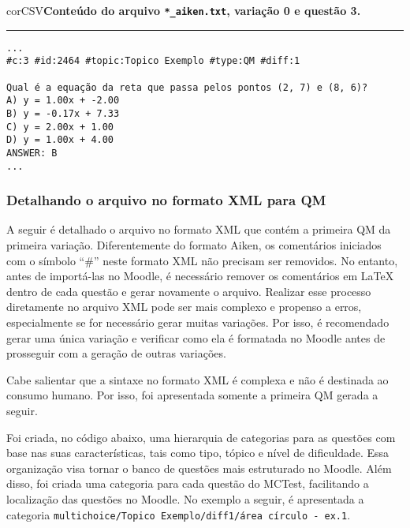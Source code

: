\begin{myboxCode}{corCSV}{\textbf{Conteúdo do arquivo \texttt{*\_aiken.txt}, variação 0 e questão 3.}}\vspace{3mm}
\hrule
\begin{verbatim}
...
#c:3 #id:2464 #topic:Topico Exemplo #type:QM #diff:1

Qual é a equação da reta que passa pelos pontos (2, 7) e (8, 6)?
A) y = 1.00x + -2.00
B) y = -0.17x + 7.33
C) y = 2.00x + 1.00
D) y = 1.00x + 4.00
ANSWER: B
...
\end{verbatim}
\end{myboxCode}

\subsubsection{Detalhando o arquivo no formato XML para QM}

A seguir é detalhado o arquivo no formato XML que contém a primeira QM da primeira variação. Diferentemente do formato Aiken, os comentários iniciados com o símbolo ``\#'' neste formato XML não precisam ser removidos. No entanto, antes de importá-las no Moodle, é necessário remover os comentários em \LaTeX{} dentro de cada questão e gerar novamente o arquivo. Realizar esse processo diretamente no arquivo XML pode ser mais complexo e propenso a erros, especialmente se for necessário gerar muitas variações. Por isso, é recomendado gerar uma única variação e verificar como ela é formatada no Moodle antes de prosseguir com a geração de outras variações.

Cabe salientar que a sintaxe no formato XML é complexa e não é destinada ao consumo humano. Por isso, foi apresentada somente a primeira QM gerada a seguir.

Foi criada, no código abaixo, uma hierarquia de categorias para as questões com base nas suas características, tais como tipo, tópico e nível de dificuldade. Essa organização visa tornar o banco de questões mais estruturado no Moodle. Além disso, foi criada uma categoria para cada questão do MCTest, facilitando a localização das questões no Moodle.
No exemplo a seguir, é apresentada a categoria  \verb|multichoice/Topico Exemplo/diff1/área círculo - ex.1|.




